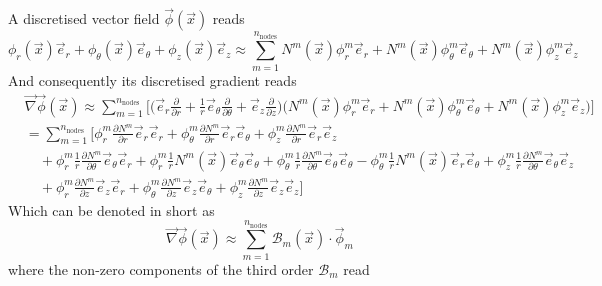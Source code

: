 \documentclass[times,namecite]{goose-article}
\begin{document}
A discretised vector field $\vec{\phi}(\vec{x})$ reads
\begin{equation}
  \phi_r (\vec{x}) \vec{e}_r + \phi_\theta (\vec{x}) \vec{e}_\theta + \phi_z (\vec{x}) \vec{e}_z
  \approx
  \sum\limits_{m=1}^{n_\mathrm{nodes}}
  N^m (\vec{x}) \phi^{m}_{r}       \vec{e}_r      +
  N^m (\vec{x}) \phi^{m}_{\theta}  \vec{e}_\theta +
  N^m (\vec{x}) \phi^{m}_{z}       \vec{e}_z
\end{equation}
And consequently its discretised gradient reads
\begin{align}
  &\vec{\nabla} \vec{\phi} (\vec{x})
  \approx
  \sum\limits_{m=1}^{n_\mathrm{nodes}}
  \Bigg[
  \bigg(
  \vec{e}_r \frac{\partial}{\partial r} +
  \frac{1}{r} \vec{e}_\theta \frac{\partial}{\partial \theta} +
  \vec{e}_z \frac{\partial}{\partial z}
  \bigg)
  \bigg(
  N^m (\vec{x}) \phi^{m}_{r}       \vec{e}_r      +
  N^m (\vec{x}) \phi^{m}_{\theta}  \vec{e}_\theta +
  N^m (\vec{x}) \phi^{m}_{z}       \vec{e}_z
  \bigg)
  \Bigg]
  \\
  &=
  \sum\limits_{m=1}^{n_\mathrm{nodes}}
  \Bigg[
    \phi^{m}_{r     } \frac{\partial N^m}{\partial r} \vec{e}_r \vec{e}_r
  + \phi^{m}_{\theta} \frac{\partial N^m}{\partial r} \vec{e}_r \vec{e}_\theta
  + \phi^{m}_{z     } \frac{\partial N^m}{\partial r} \vec{e}_r \vec{e}_z
  \nonumber
  \\
  &\quad
  + \phi^{m}_{r     } \frac{1}{r} \frac{\partial N^m }{\partial \theta} \vec{e}_\theta \vec{e}_r
  + \phi^{m}_{r     } \frac{1}{r} N^m (\vec{x}) \vec{e}_\theta \vec{e}_\theta
  + \phi^{m}_{\theta} \frac{1}{r} \frac{\partial N^m }{\partial \theta} \vec{e}_\theta \vec{e}_\theta
  - \phi^{m}_{\theta} \frac{1}{r} N^m (\vec{x}) \vec{e}_r \vec{e}_\theta
  + \phi^{m}_{z     } \frac{1}{r} \frac{\partial N^m }{\partial \theta} \vec{e}_\theta \vec{e}_z
  \nonumber
  \\
  &\quad
  + \phi^{m}_{r     } \frac{\partial N^m }{\partial z} \vec{e}_z \vec{e}_r
  + \phi^{m}_{\theta} \frac{\partial N^m }{\partial z} \vec{e}_z \vec{e}_\theta
  + \phi^{m}_{z     } \frac{\partial N^m }{\partial z} \vec{e}_z \vec{e}_z
  \Bigg]
\end{align}
Which can be denoted in short as
\begin{equation}
  \vec{\nabla} \vec{\phi} (\vec{x})
  \approx
  \sum\limits_{m=1}^{n_\mathrm{nodes}}
  \mathcal{B}_m (\vec{x}) \cdot \vec{\phi}_m
\end{equation}
where the non-zero components of the third order $\mathcal{B}_m$ read
\end{document}
